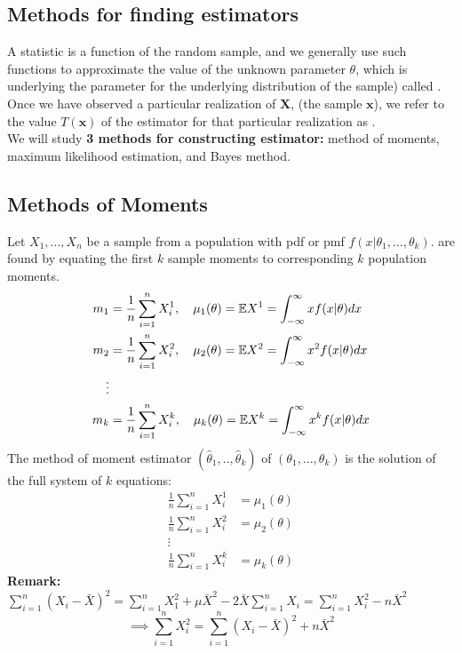 \subsection{Methods for finding estimators}
A statistic is a function of the random sample, and we generally use such functions to approximate the value of the unknown parameter $\theta$, which is underlying the parameter for the underlying distribution of the sample) called . Once we have observed a particular realization of $\boldsymbol{X}$, (the sample $\boldsymbol{x}$), we refer to the value $T(\boldsymbol{x})$ of the estimator for that particular realization as .
\\
We will study \textbf{3 methods for constructing estimator:} method of moments, maximum likelihood estimation, and Bayes method.
\subsection{Methods of Moments}
Let $X_1,...,X_n$ be a sample from a population with pdf or pmf $f(x|\theta_1,...,\theta_k)$.  are found by equating the first $k$ sample moments to corresponding $k$ population moments.
\begin{align*}
    m_1 & = \frac{1}{n}\sum_{i=1}^{n}X_i^1, \quad \mu_1(\theta) = \mathbb E X^1  = \int_{-\infty}^{\infty}xf(x|\theta)dx\\
    m_2 & = \frac{1}{n}\sum_{i=1}^{n}X_i^2, \quad \mu_2(\theta) = \mathbb E X^2= \int_{-\infty}^{\infty}x^2f(x|\theta)dx \\
    \vdots \\ 
    m_k & = \frac{1}{n}\sum_{i=1}^{n}X_i^k, \quad \mu_k(\theta) = \mathbb E X^k = 
    \int_{-\infty}^{\infty}x^kf(x|\theta)dx
\end{align*}
The method of moment estimator $(\hat{\theta}_1,..,\hat{\theta}_k)$ of $(\theta_1,...,\theta_k)$ is the solution of the full system of $k$ equations:
\begin{align*}
    \frac{1}{n}\sum_{i=1}^{n}X_i^1 &= \mu_1(\theta) \\
    \frac{1}{n}\sum_{i=1}^{n}X_i^2 &= \mu_2(\theta) \\
    \vdots \\ 
    \frac{1}{n}\sum_{i=1}^{n}X_i^k &= \mu_k(\theta) 
\end{align*}
\textbf{Remark:} $\sum_{i=1}^{n} (X_i-\bar{X})^2 = \sum_{i=1}^{n}X_1^2 + \mu \bar{X}^2 - 2\bar{X}\sum_{i=1}^{n}X_i = \sum_{i=1}^{n} X_i^2 - n\bar{X}^2$
    $$ \implies \sum_{i=1}^{n}X_i^2 = \sum_{i=1}^{n} (X_i-\bar{X})^2 +n\bar{X}^2$$
